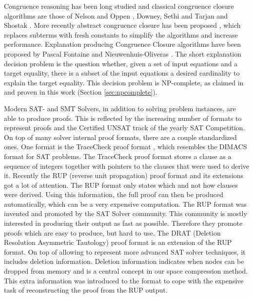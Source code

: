 Congruence reasoning has been long studied and classical congruence closure algorithms are those of Nelson and Oppen \cite{Nelson1980}, Downey, Sethi and Tarjan \cite{Downey1980} and Shostak \cite{Shostak1978}.
More recently abstract congruence closure has been proposed \cite{Bachmair2000}, which replaces subterms with fresh constants to simplify the algorithms and increase performance.
Explanation producing Congruence Closure algorithms have been proposed by Pascal Fontaine \cite{Fontaine2004} and Nieuwenhuis-Oliveras \cite{Nieuwenhuis2007,Nieuwenhuis2005}.
The short explanation decision problem is the question whether, given a set of input equations and a target equality, there is a subset of the input equations a desired cardinality to explain the target equality.
This decision problem is NP-complete, as claimed in \cite{Nieuwenhuis2005,Nieuwenhuis2007} and proven in this work (Section \ref{sec:npcomplete}).

Modern SAT- and SMT Solvers, in addition to solving problem instances, are able to produce proofs.
This is reflected by the increasing number of formats to represent proofs and the Certified UNSAT track of the yearly SAT Competition.
On top of many solver internal proof formats, there are a couple standardized ones.
One format is the TraceCheck proof format \cite{TODO}, which resembles the DIMACS format for SAT problems.
The TraceCheck proof format stores a clause as a sequence of integers together with pointers to the clauses that were used to derive it.
Recently the RUP (reverse unit propagation) proof format and its extensions got a lot of attention.
The RUP format only states which and not how clauses were derived.
Using this information, the full proof can then be produced automatically, which can be a very expensive computation.
The RUP format was invented and promoted by the SAT Solver community.
This community is mostly interested in producing their output as fast as possible.
Therefore they promote proofs which are easy to produce, but hard to use.
The DRAT (Deletion Resolution Asymmetric Tautology) proof format \cite{TODO: DRAT-trim} is an extension of the RUP format.
On top of allowing to represent more advanced SAT solver techniques, it includes deletion information.
Deletion information indicates when nodes can be dropped from memory and is a central concept in our space compression method.
This extra information was introduced to the format to cope with the expensive task of reconstructing the proof from the RUP output.


